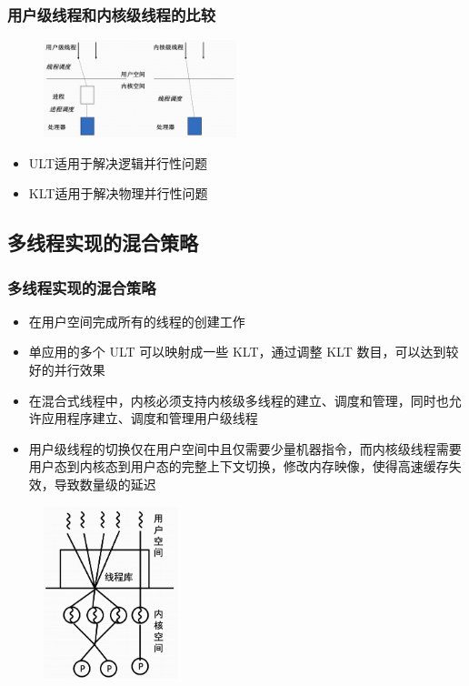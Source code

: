 \documentclass[cs4size,a4paper,10pt]{ctexart}
\begin{document}
	\subsubsection{用户级线程和内核级线程的比较}
	\begin{figure}[H]
		\centering
		\includegraphics[width=0.5\textwidth]{img/2.4.2.3}
	\end{figure}
	\begin{itemize}
		\item ULT适用于解决逻辑并行性问题
		\item KLT适用于解决物理并行性问题
	\end{itemize}


	\subsection{多线程实现的混合策略}
	\subsubsection{多线程实现的混合策略}
	\begin{itemize}
		\item 在用户空间完成所有的线程的创建工作
		\item 单应用的多个 ULT 可以映射成一些 KLT，通过调整 KLT 数目，可以达到较好的并行效果
		\item 在混合式线程中，内核必须支持内核级多线程的建立、调度和管理，同时也允许应用程序建立、调度和管理用户级线程
		\item 用户级线程的切换仅在用户空间中且仅需要少量机器指令，而内核级线程需要用户态到内核态到用户态的完整上下文切换，修改内存映像，使得高速缓存失效，导致数量级的延迟
	\end{itemize}
	\begin{figure}[H]
		\centering
		\includegraphics[width=0.35\textwidth]{img/2.4.3.1}
	\end{figure}
\end{document}
